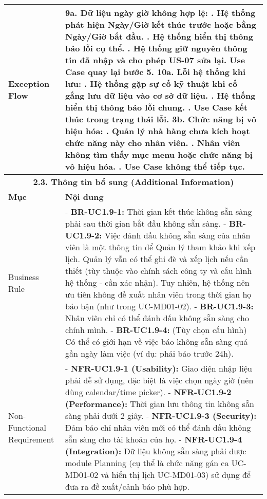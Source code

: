 \begin{longtable}{|m{4cm}|p{11cm}|}
\hline
Exception Flow & \textbf{9a. Dữ liệu ngày giờ không hợp lệ:} \newline    1. Hệ thống phát hiện Ngày/Giờ kết thúc trước hoặc bằng Ngày/Giờ bắt đầu. \newline    2. Hệ thống hiển thị thông báo lỗi cụ thể. \newline    3. Hệ thống giữ nguyên thông tin đã nhập và cho phép US-07 sửa lại. Use Case quay lại bước 5. \newline \textbf{10a. Lỗi hệ thống khi lưu:} \newline    1. Hệ thống gặp sự cố kỹ thuật khi cố gắng lưu dữ liệu vào cơ sở dữ liệu. \newline    2. Hệ thống hiển thị thông báo lỗi chung. \newline    3. Use Case kết thúc trong trạng thái lỗi. \newline \textbf{3b. Chức năng bị vô hiệu hóa:} \newline    1. Quản lý nhà hàng chưa kích hoạt chức năng này cho nhân viên. \newline    2. Nhân viên không tìm thấy mục menu hoặc chức năng bị vô hiệu hóa. \newline    3. Use Case không thể tiếp tục. \\
\hline
\multicolumn{2}{|c|}{\textbf{2.3. Thông tin bổ sung (Additional Information)}} \\
\hline
\textbf{Mục} & \textbf{Nội dung} \\
\hline
Business Rule & - \textbf{BR-UC1.9-1:} Thời gian kết thúc không sẵn sàng phải sau thời gian bắt đầu không sẵn sàng. \newline - \textbf{BR-UC1.9-2:} Việc đánh dấu không sẵn sàng của nhân viên là một thông tin để Quản lý tham khảo khi xếp lịch. Quản lý vẫn có thể ghi đè và xếp lịch nếu cần thiết (tùy thuộc vào chính sách công ty và cấu hình hệ thống - cần xác nhận). Tuy nhiên, hệ thống nên ưu tiên không đề xuất nhân viên trong thời gian họ báo bận (như trong UC-MD01-02). \newline - \textbf{BR-UC1.9-3:} Nhân viên chỉ có thể đánh dấu không sẵn sàng cho chính mình. \newline - \textbf{BR-UC1.9-4:} (Tùy chọn cấu hình) Có thể có giới hạn về việc báo không sẵn sàng quá gần ngày làm việc (ví dụ: phải báo trước 24h). \\
\hline
Non-Functional Requirement & - \textbf{NFR-UC1.9-1 (Usability):} Giao diện nhập liệu phải dễ sử dụng, đặc biệt là việc chọn ngày giờ (nên dùng calendar/time picker). \newline - \textbf{NFR-UC1.9-2 (Performance):} Thời gian lưu thông tin không sẵn sàng phải dưới 2 giây. \newline - \textbf{NFR-UC1.9-3 (Security):} Đảm bảo chỉ nhân viên mới có thể đánh dấu không sẵn sàng cho tài khoản của họ. \newline - \textbf{NFR-UC1.9-4 (Integration):} Dữ liệu không sẵn sàng phải được module Planning (cụ thể là chức năng gán ca UC-MD01-02 và hiển thị lịch UC-MD01-03) sử dụng để đưa ra đề xuất/cảnh báo phù hợp. \\
\hline

\end{longtable}

